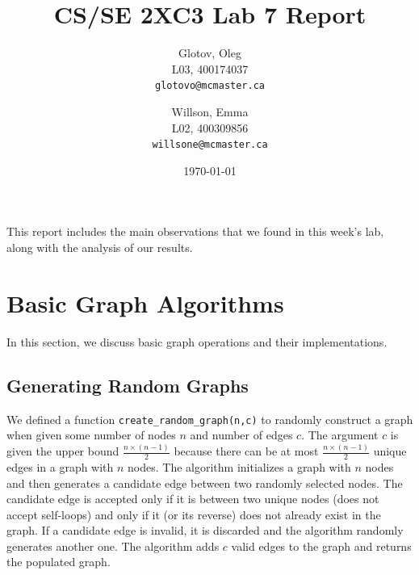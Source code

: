 \documentclass[12pt]{article}
\title{CS/SE 2XC3 Lab 7 Report}
\author{
  Glotov, Oleg\\ L03, 400174037\\
  \texttt{glotovo@mcmaster.ca}
  \and
  Willson, Emma\\ L02, 400309856\\
  \texttt{willsone@mcmaster.ca}
  }
\date{\today}
\begin{document}
\maketitle

This report includes the main observations that we found in this week's lab, along with the analysis of our results.

\newpage 
\section{Basic Graph Algorithms}
In this section, we discuss basic graph operations and their implementations. 
\subsection{Generating Random Graphs}
We defined a function \verb+create_random_graph(n,c)+ to randomly construct a graph when given some number of nodes $n$ and number of edges $c$. The argument $c$ is given the upper bound $\frac{n\times(n-1)}{2}$ because there can be at most $\frac{n\times(n-1)}{2}$ unique edges in a graph with $n$ nodes. The algorithm initializes a graph with $n$ nodes and then generates a candidate edge between two randomly selected nodes. The candidate edge is accepted only if it is between two unique nodes (does not accept self-loops) and only if it (or its reverse) does not already exist in the graph. If a candidate edge is invalid, it is discarded and the algorithm randomly generates another one. The algorithm adds $c$ valid edges to the graph and returns the populated graph.
\end{document}
